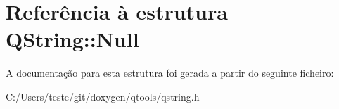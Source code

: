 \hypertarget{struct_q_string_1_1_null}{\section{Referência à estrutura Q\-String\-:\-:Null}
\label{struct_q_string_1_1_null}
}


A documentação para esta estrutura foi gerada a partir do seguinte ficheiro\-:\begin{DoxyCompactItemize}
\item 
C\-:/\-Users/teste/git/doxygen/qtools/qstring.\-h\end{DoxyCompactItemize}

